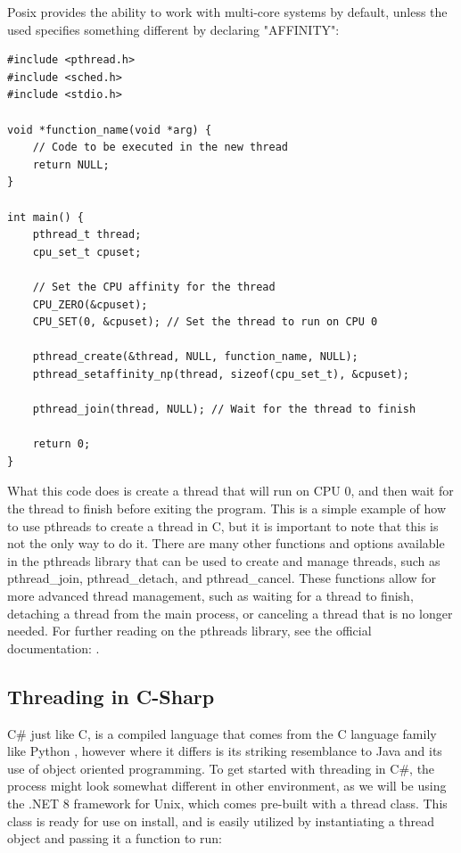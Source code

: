 \documentclass[12pt,a4paper]{article}
\begin{document}
Posix provides the ability to work with multi-core systems by default, unless the used specifies something different by declaring "AFFINITY":

\begin{verbatim}
#include <pthread.h>
#include <sched.h>
#include <stdio.h>

void *function_name(void *arg) {
    // Code to be executed in the new thread
    return NULL;
}

int main() {
    pthread_t thread;
    cpu_set_t cpuset;

    // Set the CPU affinity for the thread
    CPU_ZERO(&cpuset);
    CPU_SET(0, &cpuset); // Set the thread to run on CPU 0

    pthread_create(&thread, NULL, function_name, NULL);
    pthread_setaffinity_np(thread, sizeof(cpu_set_t), &cpuset);

    pthread_join(thread, NULL); // Wait for the thread to finish

    return 0;
}
\end{verbatim}

What this code does is create a thread that will run on CPU 0, and then wait for the thread to finish before exiting the program. This is a simple example of how to use pthreads to create a thread in C, but it is important to note that this is not the only way to do it. There are many other functions and options available in the pthreads library that can be used to create and manage threads, such as pthread\_join, pthread\_detach, and pthread\_cancel. These functions allow for more advanced thread management, such as waiting for a thread to finish, detaching a thread from the main process, or canceling a thread that is no longer needed. For further reading on the pthreads library, see the official documentation: .

\subsection{Threading in C-Sharp}

C\# just like C, is a compiled language that comes from the C language family like Python \parencite{PythonFAQ}, however where it differs is its striking resemblance to Java and its use of object oriented programming. To get started with threading in C\#, the process might look somewhat different in other environment, as we will be using the .NET 8 framework for Unix, which comes pre-built with a thread class. This class is ready for use on install, and is easily utilized by instantiating a thread object\parencite{CSThreadClass} and passing it a function to run:
\end{document}

